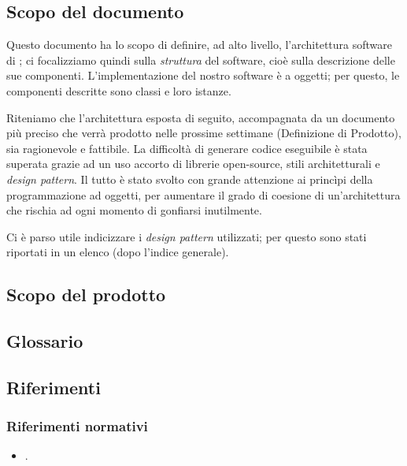 


\subsection{Scopo del documento}
Questo documento ha lo scopo di definire, ad alto livello, l'architettura software di \proj; ci focalizziamo quindi sulla \emph{struttura} del software, cioè sulla descrizione delle sue componenti. L'implementazione del nostro software è a oggetti; per questo, le componenti descritte sono classi e loro istanze.

Riteniamo che l'architettura esposta di seguito, accompagnata da un documento più preciso che verrà prodotto nelle prossime settimane (Definizione di Prodotto), sia ragionevole e fattibile. La difficoltà di generare codice eseguibile è stata superata grazie ad un uso accorto di librerie open-source, stili architetturali e \emph{design pattern}. Il tutto è stato svolto con grande attenzione ai princìpi della programmazione ad oggetti, per aumentare il grado di coesione di un'architettura che rischia ad ogni momento di gonfiarsi inutilmente.

Ci è parso utile indicizzare i \emph{design pattern} utilizzati; per questo sono stati riportati in un elenco (dopo l'indice generale).

\subsection{Scopo del prodotto}
\scopo

\subsection{Glossario}
\presgloss

\subsection{Riferimenti} \label{sec:ref}

\subsubsection{Riferimenti normativi}
\begin{itemize}
	\item \NdP.
\end{itemize}

